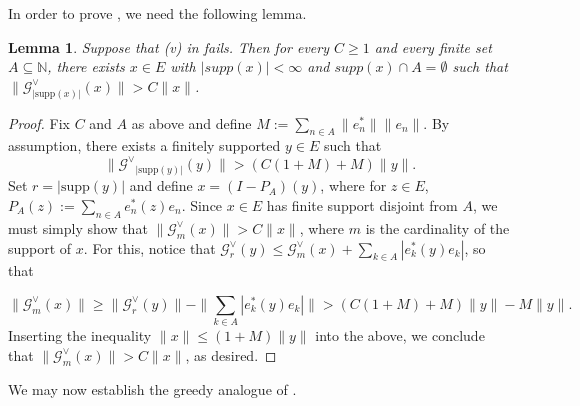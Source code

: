 \documentclass[12pt,leqno]{amsart}
\newtheorem{proposition}[theorem]{Proposition}
\newtheorem{lemma}[theorem]{Lemma}
\numberwithin{equation}{section}
\theoremstyle{definition}
\def\N{{\mathbb N}}
\begin{document}
In order to prove , we need the following lemma.
\begin{lemma}\label{greedy lemma}
Suppose that (v) in  fails. Then for every $C\geq 1$ and every finite set $A\subseteq \N$, there exists $x\in E$ with $|supp(x)|<\infty$ and $supp(x)\cap A=\emptyset$ such that $\|\mathcal{G}_{|\text{supp}(x)|}^\vee(x)\|>C\|x\|$.
\end{lemma}
\begin{proof}



Fix $C$ and $A$ as above and define $M:=\sum_{n\in A}\|e_n^*\|\|e_n\|$. By assumption, there exists a finitely supported $y\in E$ such that
 \begin{equation}\|
 {\mathcal{G}^\vee}_{|\text{supp}(y)|}(y)\|>(C(1+M)+M)\|y\|.
\end{equation}  %
Set $r=|\text{supp}(y)|$ and define $x=(I-P_A)(y)$, where for $z\in E$, $P_A(z):=\sum_{n\in A}e_n^*(z)e_n$. %
Since $x\in E$ has finite support disjoint from $A$, we  must simply show that $\|\mathcal{G}_m^\vee(x)\|>C\|x\|$, where $m$ is the cardinality of the support of $x$. For this, notice that $\mathcal{G}_r^\vee(y)\leq \mathcal{G}_m^\vee(x)+\sum_{k\in A}|e_k^*(y)e_k|$, so that 

$$\|\mathcal{G}_m^\vee(x)\|\geq \|\mathcal{G}_r^\vee(y)\|-\|\sum_{k\in A}|e_k^*(y)e_k|\|>(C(1+M)+M)\|y\|-M\|y\|.$$
Inserting the inequality $\|x\|\leq (1+M)\|y\|$ into the above, we conclude that $\|\mathcal{G}_m^\vee(x)\|>C\|x\|$, as desired.
\end{proof}
We may now  establish the greedy analogue of  .
\end{document}
